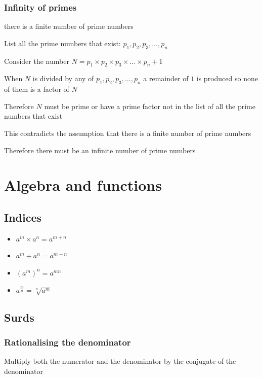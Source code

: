 \documentclass[A4paper]{article}
\begin{document}
	\subsubsection{Infinity of primes}
	\begin{description}
		\item [Assumption:] there is a finite number of prime numbers
		\item List all the prime numbers that exist: $p_1, p_2, p_3, \dots, p_n$
		\item Consider the number $N = p_1 \times p_2 \times p_3 \times \dots \times p_n + 1$
		\item When $N$ is divided by any of $p_1, p_2, p_3, \dots, p_n$ a remainder of $1$ is produced so none of them is a factor of $N$
		\item Therefore $N$ must be prime or have a prime factor not in the list of all the prime numbers that exist
		\item This contradicts the assumption that there is a finite number of prime numbers
		\item Therefore there must be an infinite number of prime numbers
	\end{description}


	\pagebreak

	\section{Algebra and functions}
	
	\subsection{Indices}
	\begin{itemize}
		\item $a^m \times a^n = a^{m+n}$
		\item $a^m \div a^n = a^{m-n}$
		\item $(a^m)^n = a^{mn}$
		\item $a^{\frac{m}{n}} = \sqrt[n]{a^m}$
	\end{itemize}
	
	\subsection{Surds}
	\subsubsection{Rationalising the denominator}
	Multiply both the numerator and the denominator by the conjugate of the denominator
	
\end{document}
